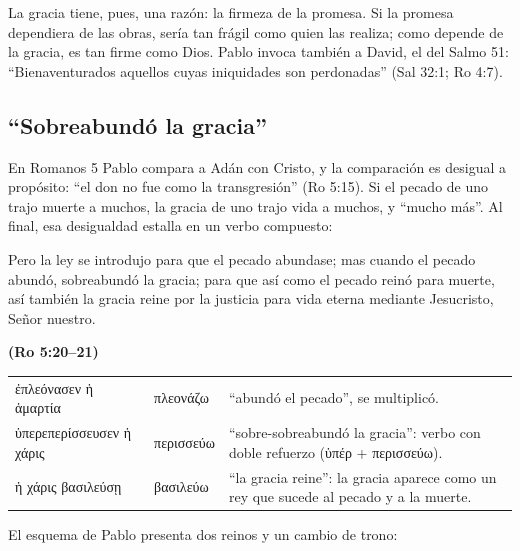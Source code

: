 \documentclass[11pt,letterpaper]{article}
\newcommand{\grc}[1]{\foreignlanguage{ancientgreek}{#1}}
\newcommand{\fuente}[1]{\par\hfill{\upshape\bfseries\small\textcolor{azul}{#1}}}
\begin{document}
La gracia tiene, pues, una razón: la firmeza de la promesa. Si la promesa dependiera de las obras, sería tan frágil como quien las realiza; como depende de la gracia, es tan firme como Dios. Pablo invoca también a David, el del Salmo 51: ``Bienaventurados aquellos cuyas iniquidades son perdonadas'' (Sal 32:1; Ro 4:7).

\subsection{``Sobreabundó la gracia''}
En Romanos 5 Pablo compara a Adán con Cristo, y la comparación es desigual a propósito: ``el don no fue como la transgresión'' (Ro 5:15). Si el pecado de uno trajo muerte a muchos, la gracia de uno trajo vida a muchos, y ``mucho más''. Al final, esa desigualdad estalla en un verbo compuesto:

\begin{cita}Pero la ley se introdujo para que el pecado abundase; mas cuando el pecado abundó, sobreabundó la gracia; para que así como el pecado reinó para muerte, así también la gracia reine por la justicia para vida eterna mediante Jesucristo, Señor nuestro.\fuente{(Ro 5:20--21)}\end{cita}

\begin{filologia}[Ro 5:20--21]
\begin{tabular}{@{}L{3.6cm}L{1.6cm}L{9.6cm}@{}}
\grc{ἐπλεόνασεν ἡ ἁμαρτία} & \grc{πλεονάζω} & ``abundó el pecado'', se multiplicó. \\[2pt]
\grc{ὑπερεπερίσσευσεν ἡ χάρις} & \grc{περισσεύω} & ``sobre-sobreabundó la gracia'': verbo con doble refuerzo (\grc{ὑπέρ} + \grc{περισσεύω}). \\[2pt]
\grc{ἡ χάρις βασιλεύσῃ} & \grc{βασιλεύω} & ``la gracia reine'': la gracia aparece como un rey que sucede al pecado y a la muerte. \\
\end{tabular}
\end{filologia}

El esquema de Pablo presenta dos reinos y un cambio de trono:
\end{document}
